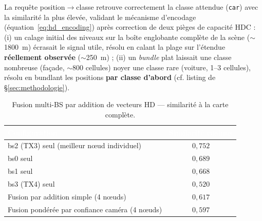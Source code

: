 \documentclass[12pt,a4paper,titlepage]{article}
\newcommand{\hd}[1]{\textcolor{white}{\textbf{#1}}}
\begin{document}
La requête position$\to$classe retrouve correctement la classe attendue (\texttt{car}) avec la similarité la plus élevée, validant le mécanisme d'encodage (équation~\eqref{eq:hd_encoding}) après correction de deux pièges de capacité HDC : (i) un calage initial des niveaux sur la boîte englobante complète de la scène ($\sim$1800~m) écrasait le signal utile, résolu en calant la plage sur l'étendue \textbf{réellement observée} ($\sim$250~m) ; (ii) un \textit{bundle} plat laissait une classe nombreuse (façade, $\sim$800 cellules) noyer une classe rare (voiture, 1--3 cellules), résolu en bundlant les positions \textbf{par classe d'abord} (cf. listing de \S\ref{sec:methodologie}).

\begin{table}[H]
    \centering
    \caption{Fusion multi-BS par addition de vecteurs HD --- similarité à la carte complète.}
    \begin{tabular}{lc}
        \toprule
        \rowcolor{tabhead}
        \hd{Configuration} & \hd{Similarité cosinus} \\
        \midrule
        bs2 (TX3) seul (meilleur n\oe ud individuel) & $0{,}752$ \\
        bs0 seul & $0{,}689$ \\
        bs1 seul & $0{,}668$ \\
        bs3 (TX4) seul & $0{,}520$ \\
        Fusion par addition simple (4 n\oe uds) & $0{,}617$ \\
        Fusion pondérée par confiance caméra (4 n\oe uds) & $0{,}597$ \\
        \bottomrule
    \end{tabular}
\end{table}
\end{document}
